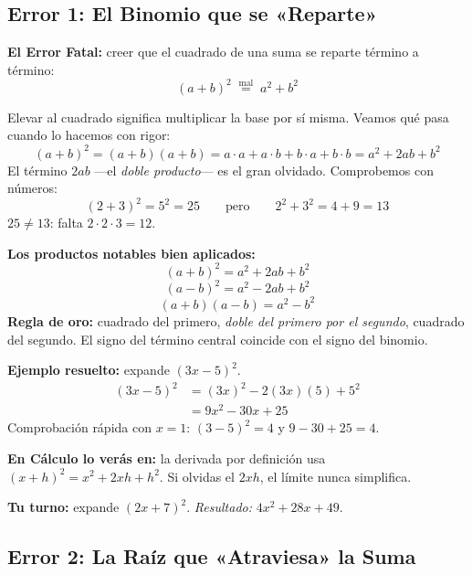 \documentclass[12pt, letterpaper]{article}
\begin{document}
\subsection{Error 1: El Binomio que se «Reparte»}

\begin{cuadroadvertencia}
  \textbf{El Error Fatal:} creer que el cuadrado de una suma se reparte término a término:
  \[
    (a+b)^2 \;\overset{\text{mal}}{=}\; a^2 + b^2
  \]
\end{cuadroadvertencia}

Elevar al cuadrado significa multiplicar la base por sí misma. Veamos qué pasa cuando lo hacemos con rigor:
\[
  (a+b)^2 = (a+b)(a+b) = a \cdot a + a \cdot b + b \cdot a + b \cdot b = a^2 + 2ab + b^2
\]
El término $2ab$ —el \emph{doble producto}— es el gran olvidado. Comprobemos con números:
\[
  (2+3)^2 = 5^2 = 25 \qquad\text{pero}\qquad 2^2 + 3^2 = 4 + 9 = 13
\]
$25 \neq 13$: falta $2 \cdot 2 \cdot 3 = 12$.

\begin{cuadrosolucion}
  \textbf{Los productos notables bien aplicados:}
  \[
    (a+b)^2 = a^2 + 2ab + b^2
  \]
  \[
    (a-b)^2 = a^2 - 2ab + b^2
  \]
  \[
    (a+b)(a-b) = a^2 - b^2
  \]
  \textbf{Regla de oro:} cuadrado del primero, \emph{doble del primero por el segundo}, cuadrado del segundo. El signo del término central coincide con el signo del binomio.
\end{cuadrosolucion}

\begin{cuadropasos}
  \textbf{Ejemplo resuelto:} expande $(3x - 5)^2$.
  \begin{align*}
    (3x - 5)^2 &= (3x)^2 - 2(3x)(5) + 5^2 \\
                &= 9x^2 - 30x + 25
  \end{align*}
  Comprobación rápida con $x = 1$: $(3-5)^2 = 4$ y $9 - 30 + 25 = 4$. \checkmark
\end{cuadropasos}

\noindent\textbf{En Cálculo lo verás en:} la derivada por definición usa $(x+h)^2 = x^2 + 2xh + h^2$. Si olvidas el $2xh$, el límite nunca simplifica.

\noindent\textbf{Tu turno:} expande $(2x + 7)^2$. \emph{Resultado:} $4x^2 + 28x + 49$.

\subsection{Error 2: La Raíz que «Atraviesa» la Suma}
\end{document}
